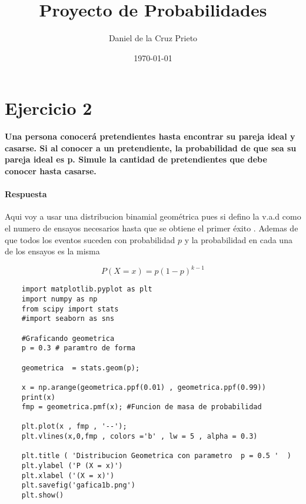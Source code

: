 \documentclass{article}
\begin{document}
    \title{Proyecto de Probabilidades} 
	\author{Daniel de la Cruz Prieto}
	\date{\today}    
    \maketitle
    
    \section*{Ejercicio 2 }  
    {\bf Una persona conocer\'a pretendientes hasta encontrar su pareja ideal y
    casarse. Si al conocer a un pretendiente, la probabilidad de que sea su pareja ideal
    es p. Simule la cantidad de pretendientes que debe conocer hasta casarse.}
    
    \paragraph{Respuesta} 

    Aqui voy a usar una distribucion binamial geom\'etrica  pues si defino la v.a.d como 
    el numero de ensayos necesarios hasta que se obtiene el primer \'exito . Ademas de 
    que todos los eventos suceden con probabilidad $p$ y la probabilidad en cada una de 
    los ensayos es la misma 

    \begin{equation}
        P \left(X = x \right) = p \left(1-p\right)^{k-1} 
    \end{equation}


    \begin{verbatim} 
    import matplotlib.pyplot as plt 
    import numpy as np 
    from scipy import stats 
    #import seaborn as sns 

    #Graficando geometrica 
    p = 0.3 # paramtro de forma 

    geometrica  = stats.geom(p); 

    x = np.arange(geometrica.ppf(0.01) , geometrica.ppf(0.99))
    print(x) 
    fmp = geometrica.pmf(x); #Funcion de masa de probabilidad 

    plt.plot(x , fmp , '--'); 
    plt.vlines(x,0,fmp , colors ='b' , lw = 5 , alpha = 0.3) 

    plt.title ( 'Distribucion Geometrica con parametro  p = 0.5 '  )
    plt.ylabel ('P (X = x)') 
    plt.xlabel ('(X = x)')
    plt.savefig('gafica1b.png')
    plt.show() 
    \end{verbatim}
    
            

	
\end{document}
